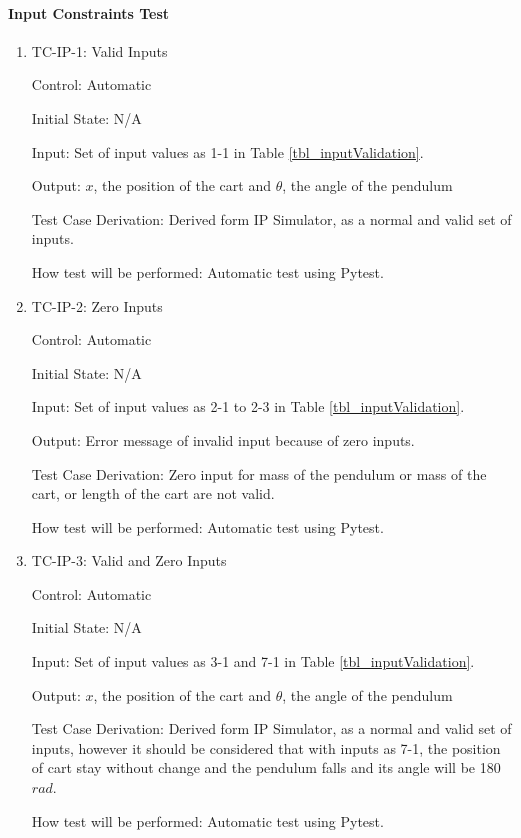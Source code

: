 \documentclass[12pt, titlepage]{article}
\begin{document}
 
\paragraph{Input Constraints Test}

\begin{enumerate}

\item{TC-IP-1: Valid Inputs}

Control: Automatic
					
Initial State: N/A 
					
Input: Set of input values as 1-1 in Table \ref{tbl_inputValidation}.
					
Output: $x$, the position of the cart and $\theta$, the angle of the pendulum

Test Case Derivation: Derived form IP Simulator, as a normal and valid set of inputs.
					
How test will be performed: Automatic test using Pytest.

\item{TC-IP-2: Zero Inputs}

Control: Automatic
					
Initial State: N/A 
					
Input: Set of input values as 2-1 to 2-3 in Table \ref{tbl_inputValidation}.
					
Output: Error message of invalid input because of zero inputs.

Test Case Derivation: Zero input for mass of the pendulum or mass of the cart, or length of the cart are not valid.
					
How test will be performed: Automatic test using Pytest.

\item{TC-IP-3: Valid and Zero Inputs}

Control: Automatic
					
Initial State: N/A 
					
Input: Set of input values as 3-1  and 7-1 in Table \ref{tbl_inputValidation}.
					
Output: $x$, the position of the cart and $\theta$, the angle of the pendulum

Test Case Derivation: Derived form IP Simulator, as a normal and valid set of inputs, however it should be considered that with inputs as 7-1, the position of cart stay without change and the pendulum falls and its angle will be 180 $rad$.
					
How test will be performed: Automatic test using Pytest.


\end{enumerate}
\end{document}
